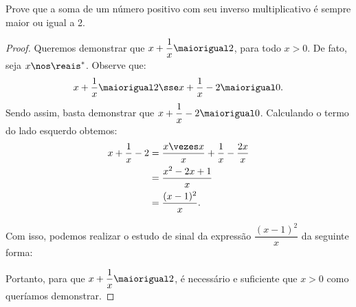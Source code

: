\begin{example}
    Prove que a soma de um número positivo com seu inverso multiplicativo é sempre maior ou igual a 2.
\end{example}

\begin{proof}
    Queremos demonstrar que $x + \dfrac 1 x \maiorigual 2$, para todo $x > 0$. De fato, seja $x \nos \reais^\ast$. Observe que:
    \[
        x + \dfrac 1 x \maiorigual 2 \sse x + \dfrac 1 x - 2 \maiorigual 0.
    \]
    Sendo assim, basta demonstrar que $x + \dfrac 1 x - 2 \maiorigual 0$. Calculando o termo do lado esquerdo obtemos:
    \begin{align*}
        x + \dfrac 1 x - 2 &= \dfrac {x \vezes x} x + \dfrac 1 x -  \dfrac {2x} x \\
                           &= \dfrac {x^2 - 2x + 1} x \\
                           &= \dfrac {(x - 1)^2} x.
    \end{align*}

    Com isso, podemos realizar o estudo de sinal da expressão $\dfrac {(x - 1)^2} x$ da seguinte forma:
    \begin{figure}[H]
        \centering
        \caption{}
    \end{figure}

    Portanto, para que $x + \dfrac 1 x \maiorigual 2$, é necessário e suficiente que $x > 0$ como queríamos demonstrar.
\end{proof}